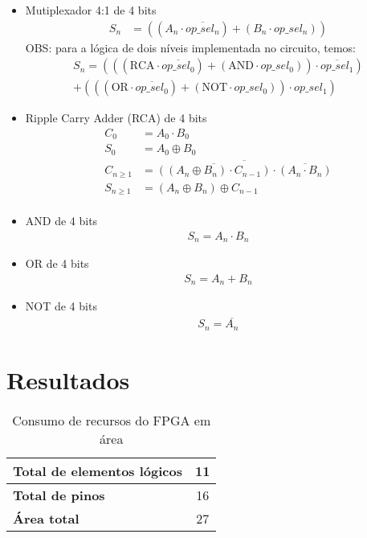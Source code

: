 \documentclass[12pt, fleqn]{article}
\begin{document}
\begin{itemize}
    \item Mutiplexador 4:1 de 4 bits
        \begin{align*}
            S_n &= ((A_n\cdot \overline{op\_sel_n})+(B_n\cdot op\_sel_n))
        \end{align*}
        OBS: para a lógica de dois níveis implementada no circuito, temos:
        \begin{align*}
            S_n = (((\text{RCA}\cdot \overline{op\_sel_0}) + (\text{AND}\cdot op\_sel_0))\cdot\overline{op\_sel_1}) \\
            +(((\text{OR}\cdot \overline{op\_sel_0})+(\text{NOT}\cdot op\_sel_0))\cdot op\_sel_1)
        \end{align*}
    \item Ripple Carry Adder (RCA) de 4 bits
        \begin{align*}
            C_0 &= A_0 \cdot B_0 \\
            S_0 &= A_0 \oplus B_0 \\
            C_{n \ge 1} &= \overline{\overline{((A_n \oplus B_n) \cdot C_{n-1})} \cdot \overline{(A_n \cdot B_n)}} \\
            S_{n \ge 1} &= (A_n \oplus B_n) \oplus C_{n-1} \\
        \end{align*}
    \item AND de 4 bits
        \begin{align*}
            S_n = A_n \cdot B_n
        \end{align*}
    \item OR de 4 bits
        \begin{align*}
            S_n = A_n + B_n
        \end{align*}
    \item NOT de 4 bits
        \begin{align*}
            S_n = \overline{A_n}
        \end{align*}
\end{itemize}

\section{Resultados}

\begin{table}[H]
    \centering
    \begin{tabular}{|l | c|}
        \hline
        \textbf{Total de elementos lógicos} & 11 \\
        \hline
        \textbf{Total de pinos} & 16 \\
        \hline
        \textbf{Área total} & 27 \\
        \hline
    \end{tabular}
    \caption{Consumo de recursos do FPGA em área}
\end{table}
\end{document}

